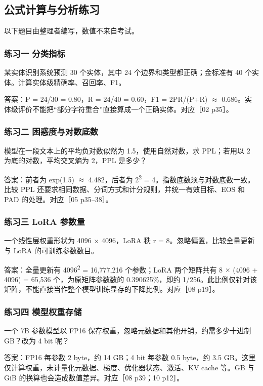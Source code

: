 \documentclass[UTF8,a4paper,zihao=-4,fontset=windows]{ctexart}
\begin{document}
\subsection*{公式计算与分析练习}
以下题目由整理者编写，数值不来自考试。

\subsubsection*{练习一 分类指标}
某实体识别系统预测 30 个实体，其中 24 个边界和类型都正确；金标准有 40 个实体。计算实体级精确率、召回率、F1。

答案：P = 24/\allowbreak{}30 = 0.80，R = 24/\allowbreak{}40 = 0.60，F1 = 2PR/\allowbreak{}(P+R) \ensuremath{\approx} 0.686。实体级评价不能把“部分字符重合”直接算成一个正确实体。对应［02 p35］。

\subsubsection*{练习二 困惑度与对数底数}
模型在一段文本上的平均负对数似然为 1.5，使用自然对数，求 PPL；若用以 2 为底的对数，平均交叉熵为 2，PPL 是多少？

答案：前者为 exp(1.5) \ensuremath{\approx} 4.482，后者为 2\textsuperscript{2} = 4。指数底数须与对数底数一致。比较 PPL 还要求相同数据、分词方式和计分规则，并统一有效目标、EOS 和 PAD 的处理。对应［05 p35--38］。

\subsubsection*{练习三 LoRA 参数量}
一个线性层权重形状为 4096 \ensuremath{\times} 4096，LoRA 秩 r = 8。忽略偏置，比较全量更新与 LoRA 的可训练参数数目。

答案：全量更新有 4096\textsuperscript{2} = 16,777,216 个参数；LoRA 两个矩阵共有 8 \ensuremath{\times} (4096 + 4096) = 65,536 个，为原矩阵参数数的 0.390625\%，即约 1/\allowbreak{}256。此比例仅针对该矩阵，不能直接当作整个模型训练显存的下降比例。对应［08 p19］。

\subsubsection*{练习四 模型权重存储}
一个 7B 参数模型以 FP16 保存权重，忽略元数据和其他开销，约需多少十进制 GB？改为 4 bit 呢？

答案：FP16 每参数 2 byte，约 14 GB；4 bit 每参数 0.5 byte，约 3.5 GB。这里仅计算权重，未计量化元数据、梯度、优化器状态、激活、KV cache 等。GB 与 GiB 的换算也会造成数值差异。对应［08 p39；10 p12］。
\end{document}
